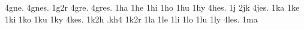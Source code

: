 {4gne.                                                                           
4gnes.                                                                          
1g2r                                                                            
4gre.                                                                           
4gres.                                                                          
1ha                                                                             
1he                                                                             
1hi                                                                             
1ho                                                                             
1hu                                                                             
1hy                                                                             
4hes.                                                                           
1j                                                                              
2jk                                                                             
4jes.                                                                           
1ka                                                                             
1ke                                                                             
1ki                                                                             
1ko                                                                             
1ku                                                                             
1ky                                                                             
4kes.                                                                           
1k2h                                                                            
.kh4                                                                            
1k2r                                                                            
1la                                                                             
1le                                                                             
1li                                                                             
1lo                                                                             
1lu                                                                             
1ly                                                                             
4les.                                                                           
1ma                                                                             
}
